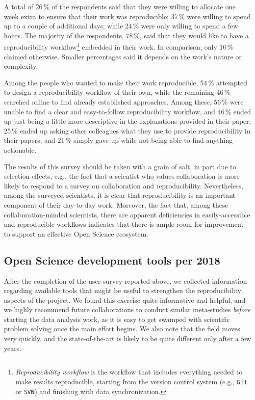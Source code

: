 \documentclass[twocolumn]{aa}
\begin{document}
A total of 26\,\% of the respondents said that they were willing to allocate one week extra to ensure that their work was reproducible; 37\,\% were willing to spend up to a couple of additional days; while 24\,\% were only willing to spend a few hours. The majority of the respondents, 78\,\%, said that they would like to have a reproducibility workflow\footnote{\textit{Reproducibility workflow} is the workflow that includes everything needed to make results reproducible,  starting from the version control system (e.g., \texttt{Git} or \texttt{SVN}) and finishing with data synchronization.}  embedded in their work. In comparison, only 10\,\% claimed otherwise. Smaller percentages said it depends on the work's nature or complexity.

Among the people who wanted to make their work reproducible, 54\,\% attempted to design a reproducibility workflow of their own, while the remaining 46\,\% searched online to find already established approaches. Among these, 56\,\% were unable to find a clear and easy-to-follow reproducibility workflow, and 46\,\% ended up just being a little more descriptive in the explanations provided in their paper; 25\,\% ended up asking other colleagues what they use to provide reproducibility in their papers; and 21\,\% simply gave up while not being able to find anything actionable.

The results of this survey should be taken with a grain of salt, in part due to selection effects, e.g., the fact that a scientist who values collaboration is more likely to respond to a survey on collaboration and reproducibility. Nevertheless, among the surveyed scientists, it is clear that reproducibility is an important component of their day-to-day work. Moreover, the fact that, among these collaboration-minded scientists, there are apparent deficiencies in easily-accessible and reproducible workflows indicates that there is ample room for improvement to support an effective Open Science ecosystem.


\subsection{Open Science development tools per 2018}

After the completion of the user survey reported above, we collected information regarding available tools that might be useful to strengthen the reproducibility aspects of the project. We found this exercise quite informative and helpful, and we highly recommend future collaborations to conduct similar meta-studies \emph{before} starting the data analysis work, as it is easy to get swamped with scientific problem solving once the main effort begins. We also note that the field moves very quickly, and the state-of-the-art is likely to be quite different only after a few years.
\end{document}
